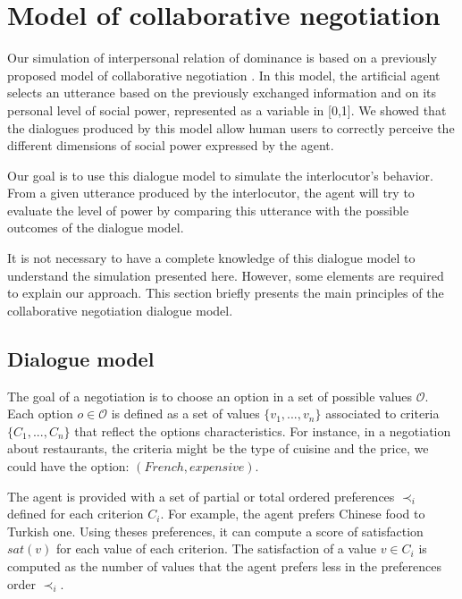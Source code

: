 \documentclass[conference, letterpaper]{IEEEtran}
\begin{document}
\section{Model of collaborative negotiation}

Our simulation of interpersonal relation of dominance is based on a previously proposed model of collaborative negotiation \cite{x}. In this model, the artificial agent selects an utterance based on the previously exchanged information and on its personal level of social power, represented as a variable in [0,1]. We showed that the dialogues produced by this model allow human users to correctly perceive the different dimensions of social power expressed by the agent.

Our goal is to use this dialogue model to simulate the interlocutor's behavior. From a given utterance produced by the interlocutor, the agent will try to evaluate the level of power by comparing this utterance with the possible outcomes of the dialogue model.

It is not necessary to have a complete knowledge of this dialogue model to understand the simulation presented here. However, some elements are required to explain our approach. This section briefly presents the main principles of the collaborative negotiation dialogue model.

\subsection{Dialogue model}

The goal of a negotiation is to choose an option in a set of possible values $\mathcal{O}$. Each option $o\in\mathcal{O}$ is defined as a set of values $\{v_1, ..., v_n\}$ associated to criteria $\{C_1, ..., C_n\}$ that reflect the options characteristics.  For instance, in a negotiation about restaurants, the criteria might be the type of cuisine and the price, we could have the option: $(French,expensive)$.

The agent is provided with a set of partial or total ordered preferences $\prec_i$ defined for each criterion $C_i$. For example, the agent prefers Chinese food to Turkish one. Using theses preferences, it can compute a score of satisfaction $sat(v)$ for each value of each criterion. The satisfaction of a value $v \in C_i$ is computed as the number of values that the agent prefers less in the preferences order $\prec_i$.
\end{document}
